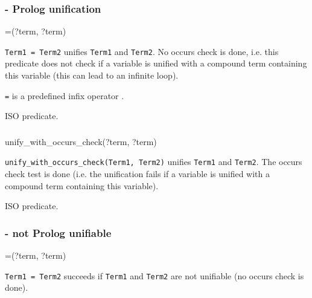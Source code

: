 \subsubsection{ - Prolog unification}

\begin{TemplatesOneCol}
=(?term, ?term)

\end{TemplatesOneCol}

\Description

\texttt{Term1 = Term2} unifies \texttt{Term1} and \texttt{Term2}. No occurs
check is done, i.e. this predicate does not check if a variable is unified
with a compound term containing this variable (this can lead to an infinite
loop).

\texttt{=} is a predefined infix operator .

\PlErrorsNone

\Portability

ISO predicate.

\subsubsection{}

\begin{TemplatesOneCol}
unify\_with\_occurs\_check(?term, ?term)
\end{TemplatesOneCol}

\Description

\texttt{unify\_with\_occurs\_check(Term1, Term2)} unifies \texttt{Term1} and
\texttt{Term2}. The occurs check test is done (i.e. the unification fails if
a variable is unified with a compound term containing this variable).

\PlErrorsNone

\Portability

ISO predicate.

\subsubsection{ - not Prolog unifiable}

\begin{TemplatesOneCol}
{\bs}=(?term, ?term)
\end{TemplatesOneCol}

\Description

\texttt{Term1 {\bs}= Term2} succeeds if \texttt{Term1} and \texttt{Term2}
are not unifiable (no occurs check is done).

